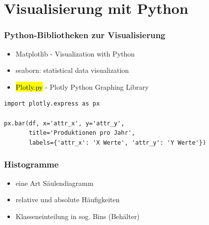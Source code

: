 \section{Visualisierung mit Python}


\begin{frame}[fragile]
\frametitle{Python-Bibliotheken zur Visualisierung}

\begin{itemize}
	\item Matplotlib - Visualization with Python
	\item seaborn: statistical data visualization
	\item \hl{Plotly.py} - Plotly Python Graphing Library
\end{itemize}

\begin{verbatim}
import plotly.express as px

px.bar(df, x='attr_x', y='attr_y',
       title='Produktionen pro Jahr',
       labels={'attr_x': 'X Werte', 'attr_y': 'Y Werte'})
\end{verbatim}
\end{frame}


\begin{frame}
\frametitle{Histogramme}

\begin{itemize}
	\item eine Art Säulendiagramm
	\item relative und absolute Häufigkeiten
	\item Klasseneinteilung in sog. \alert{Bins} (Behälter)
\end{itemize}
\end{frame}


